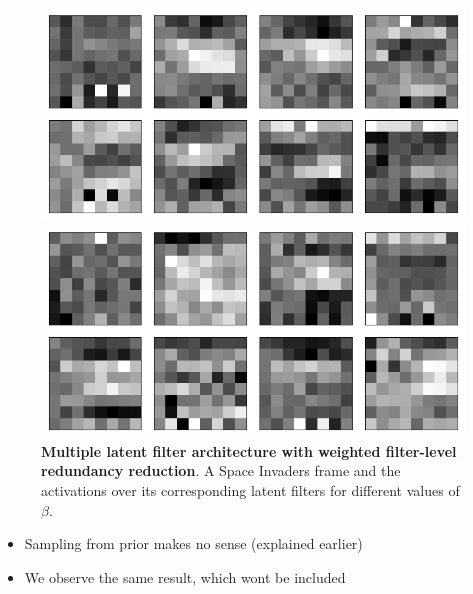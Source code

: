 \begin{figure}[h!]
\begin{minipage}{0.55\textwidth}
\caption{$\beta = 1$}
\includegraphics[scale=0.42]{figures/results/weighted_average/beta_4_convolutional_layers_sample_3.png}
\caption{$\beta = 4$}
\includegraphics[scale=0.42]{figures/results/weighted_average/beta_32_convolutional_layers_sample_3.png}
\caption{$\beta = 32$}
\end{minipage}
\caption{\textbf{Multiple latent filter architecture with weighted filter-level redundancy reduction}. A Space Invaders frame and the activations over its corresponding latent filters for different values of $\beta$.}
\label{fig:weighted_average_originals_and_latent_filters}
\end{figure}

\begin{itemize}
\item Sampling from prior makes no sense (explained earlier)
\item We observe the same result, which wont be included
\end{itemize}



